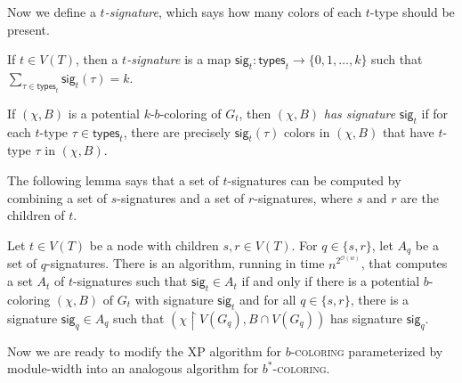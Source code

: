 \documentclass[runningheads, envcountsame]{llncs}
\newcommand{\ca}{\mathcal}
\newcommand{\XP}{\textsf{XP}\xspace}
\newcommand\ctypes{\mathsf{types}}
\newcommand\csig{\mathsf{sig}}
\newcommand{\bscoloring}{$b^*$-\textsc{coloring}\xspace}
\newcommand{\bcoloring}{$b$-\textsc{coloring}\xspace}
\begin{document}
Now we define a \emph{$t$-signature}, which says how many colors of each $t$-type should be present.

\begin{definition}\label{def:cw-signature}
If $t \in V(T)$, then a \emph{$t$-signature} is a map $\csig_t \colon \ctypes_t \to \{0, 1, \ldots, k\}$ such that  $\sum_{\tau \in \ctypes_t}\csig_t(\tau) = k$.

If $(\chi, B)$ is a potential $k$-$b$-coloring of $G_t$, then $(\chi, B)$ \emph{has signature} $\csig_t$ if for each $t$-type $\tau \in \ctypes_t$, there are precisely $\csig_t(\tau)$ colors in $(\chi, B)$ that have $t$-type $\tau$ in $(\chi, B)$.
\end{definition}

The following lemma says that a set of $t$-signatures can be computed by combining a set of $s$-signatures and a set of $r$-signatures, where $s$ and $r$ are the children of $t$. 

\begin{lemma}\label{lem:cw-black-box}
Let $t \in V(T)$ be a node with children $s, r \in V(T)$.
For $q \in \{s, r\}$, let $A_q$ be a set of $q$-signatures.
There is an algorithm, running in time $n^{2^{\ca O(w)}}$, that computes a set $A_t$ of $t$-signatures such that $\csig_t \in A_t$ if and only if there is a potential $b$-coloring $(\chi, B)$ of $G_t$ with signature $\csig_t$ and for all $q \in \{s, r\}$, there is a signature $\csig_q \in A_q$ such that $(\chi \upharpoonright V(G_q), B \cap V(G_q))$ has  signature $\csig_q$.
\end{lemma}

Now we are ready to modify the \XP algorithm for \bcoloring parameterized by module-width into an analogous algorithm for \bscoloring.
\end{document}
